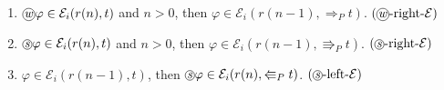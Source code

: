 \documentclass[envcountsect,envcountsame,oribibl,orivec]{llncs}
\newcommand*\circled[1]{\tikz[baseline=(char.base)]{
		\node[shape=circle,draw,inner sep=0.4pt] (char) {#1};}}
\newcommand{\wprevious}{\circled{\textit{w}}}
\newcommand{\sprevious}{\circled{\textit{s}}}
\newcommand{\tsprevright}{\Rrightarrow_P}
\newcommand{\tsprevleft}{\Lleftarrow_P}
\newcommand{\twprevright}{\Rightarrow_P}
\newcommand{\agent}{i}
\newcommand{\wprevrightshiftevidence}{\ensuremath{(\wprevious\text{-right-}\evidence)}}
\newcommand{\sprevrightshiftevidence}{\ensuremath{(\sprevious\text{-right-}\evidence)}}
\newcommand{\sprevleftshiftevidence}{\ensuremath{(\sprevious\text{-left-}\evidence)}}
\newcommand{\evidence}{\mathcal{E}}
\renewcommand{\phi}{\varphi}
\begin{document}
\begin{definition}
\begin{enumerate}
		\item $\wprevious \phi \in \evidence_\agent(r(n),t)$ and $n>0$, then $\phi \in \evidence_\agent(r(n-1), \twprevright t)$. \hfill $\wprevrightshiftevidence$
		
		
		\item $\sprevious \phi \in \evidence_\agent(r(n),t)$ and $n>0$, then $\phi \in \evidence_\agent(r(n-1), \tsprevright t)$.  \hfill $\sprevrightshiftevidence$
		
		\item $\phi \in \evidence_\agent(r(n-1),t)$, then $\sprevious \phi \in \evidence_\agent(r(n), \tsprevleft t)$. \hfill $\sprevleftshiftevidence$
	\end{enumerate}
\end{definition}
\end{document}
